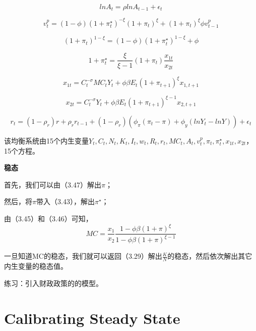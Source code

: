 \documentclass[cn,10pt,math=newtx,citestyle=gb7714-2015,bibstyle=gb7714-2015]{elegantbook}
\begin{document}
	\begin{equation}\label{label}
		lnA_t=\rho lnA_{t-1}+\epsilon_t
	\end{equation}
	
	\begin{equation}\label{label}
		v_t^p=(1-\phi)(1+\pi_t^{\star})^{-\xi}(1+\pi_t)^{\xi}+(1+\pi_t)^{\xi}\phi v_{t-1}^p
	\end{equation}
	
	\begin{equation}\label{label}
		(1+\pi_t)^{1-\xi}=(1-\phi)(1+\pi_t^{\star})^{1-\xi}+\phi
	\end{equation}
	
	\begin{equation}\label{label}
		1+\pi_t^{\star}=\frac{\xi}{\xi-1}(1+\pi_t)\frac{x_{1t}}{x_{2t}}
	\end{equation}
	
	\begin{equation}\label{label}
		x_{1t}=C_t^{-\sigma}MC_tY_t+\phi \beta E_t(1+\pi_{t+1})^{\xi}x_{1,t+1}
	\end{equation}
	
	\begin{equation}\label{label}
		x_{2t}=C_t^{-\sigma}Y_t+\phi \beta E_t(1+\pi_{t+1})^{\xi-1}x_{2,t+1}
	\end{equation}
	
	\begin{equation}\label{label}
		r_t=(1-\rho_r)r+\rho_rr_{t-1}+(1-\rho_r)(\phi_{\pi}(\pi_t-\pi)+\phi_y(lnY_t-lnY))+\epsilon_t
	\end{equation}
	
	该均衡系统由15个内生变量$Y_t,C_t,N_t,K_t,I_t,w_t,R_t,r_t,MC_t,A_t,v_t^p,\pi_t,\pi_t^{\star},x_{1t},x_{2t}$，15个方程。
	
	\textbf{稳态}
	
	首先，我们可以由（3.47）解出$\pi$；
	
	然后，将$\pi$带入（3.43），解出$\pi^{\star}$；
	
	由（3.45）和（3.46）可知，
	$$MC=\frac{x_{1}}{x_{2}}\frac{1-\phi \beta(1+\pi)^{\xi}}{1-\phi \beta(1+\pi)^{\xi-1}}$$
	
	一旦知道MC的稳态，我们就可以返回（3.29）解出$\frac{K}{N}$的稳态，然后依次解出其它内生变量的稳态值。
	
	练习：引入财政政策的的模型。
	
	
	\section{Calibrating Steady State}
	
\end{document}
